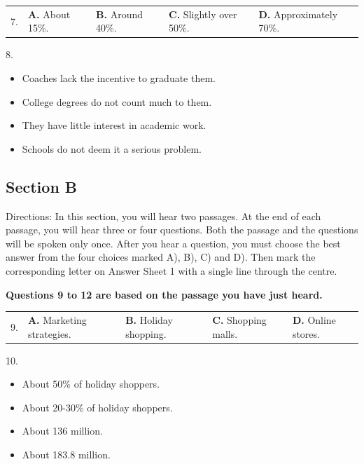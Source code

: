 \documentclass[UTF8,11pt]{ctexart}
\begin{document}
\noindent\begin{tabularx}{\linewidth}{@{}lXXXX@{}}7. & \textbf{A.} About 15\%. & \textbf{B.} Around 40\%. & \textbf{C.} Slightly over 50\%. & \textbf{D.} Approximately 70\%.\\\end{tabularx}\par

8.


\begin{itemize}[leftmargin=2em,itemsep=.2em,topsep=.4em]\item[A.] Coaches lack the incentive to graduate them.
\item[B.] College degrees do not count much to them.
\item[C.] They have little interest in academic work.
\item[D.] Schools do not deem it a serious problem.
\end{itemize}

\subsection*{\textbf{Section B}}


Directions: In this section, you will hear two passages. At the end of each passage, you will hear three or four questions. Both the passage and the questions will be spoken only once. After you hear a question, you must choose the best answer from the four choices marked A), B), C) and D). Then mark the corresponding letter on Answer Sheet 1 with a single line through the centre.


\textbf{Questions 9 to 12 are based on the passage you have just heard.}


\noindent\begin{tabularx}{\linewidth}{@{}lXXXX@{}}9. & \textbf{A.} Marketing strategies. & \textbf{B.} Holiday shopping. & \textbf{C.} Shopping malls. & \textbf{D.} Online stores.\\\end{tabularx}\par

10.


\begin{itemize}[leftmargin=2em,itemsep=.2em,topsep=.4em]\item[A.] About 50\% of holiday shoppers.
\item[B.] About 20-30\% of holiday shoppers.
\item[C.] About 136 million.
\item[D.] About 183.8 million.
\end{itemize}
\end{document}
